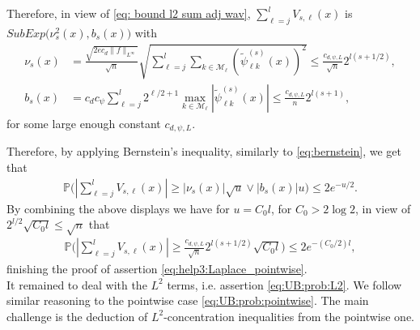 \documentclass[preprint]{imsart}
\renewcommand{\P}{\mathbb{P}}
\numberwithin{equation}{section}
\begin{document}
\begin{appendix}
Therefore, in view of \eqref{eq: bound l2 sum adj wav}, $\sum_{\ell=j}^l V_{s,\ell}(x)$ is $SubExp\big(\nu_{s}^2(x),b_{s}(x)\big)$ with
\begin{align}
\nu_{s}(x)&= \frac{\sqrt{2ec_d\|f\|_{L^\infty}}  }{\sqrt{n}} \sqrt{\sum_{\ell=j}^l\sum_{k\in\mathcal{M}_\ell} (\tilde\psi_{\ell k}^{(s)}(x))^2}\leq \frac{c_{d,\psi,L}} {\sqrt{n}} 2^{l(s+1/2)} ,\nonumber\\
b_{s}(x)&=c_dc_{\psi} \sum_{\ell=j}^l  2^{\ell/2+1} \max_{k\in\mathcal{M}_{\ell}} |  \tilde\psi_{\ell k}^{(s)}(x)|\leq  \frac{c_{d,\psi,L}} {n}2^{l(s+1)}, \label{def:nu:b2}
\end{align}
for some large enough constant $c_{d,\psi,L}$. 

Therefore, by applying Bernstein's inequality, similarly to \eqref{eq:bernstein}, we get that
\begin{align}
\P\Big(|\sum_{\ell=j}^l V_{s,\ell}(x)| \geq  |\nu_{s}(x)|\sqrt{u}\vee |b_{s}(x)| u\Big)\leq 2e^{-u/2}.\label{eq:bernstein2}
\end{align}
By combining the above displays we have for $u=C_0l$, for $C_0>2\log 2$, in view of $2^{l/2}\sqrt{C_0l}\leq \sqrt{n}$ that
\begin{align}
\P\Big(|\sum_{\ell=j}^l V_{s,\ell}(x)| \geq   \frac{c_{d,\psi,L}}{\sqrt{n}}2^{l(s+1/2)} \sqrt{C_0l} \Big)\leq 2e^{-(C_0/2)l},\label{ub:V_sl}
\end{align}
 finishing the proof of assertion \eqref{eq:help3:Laplace_pointwise}.\\





It remained to deal with the $L^2$ terms, i.e. assertion \eqref{eq:UB:prob:L2}.  We follow similar reasoning to the pointwise case \eqref{eq:UB:prob:pointwise}. The main challenge is the deduction of $L^2$-concentration inequalities from the pointwise one.


\end{appendix}
\end{document}
